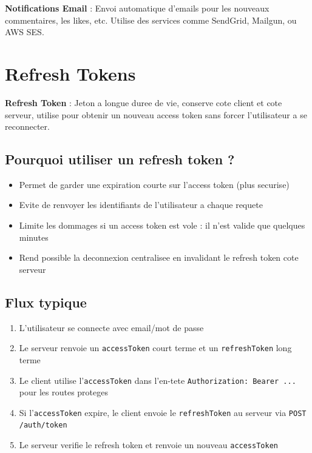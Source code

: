 \documentclass[a4paper,12pt]{book}
\begin{document}
\begin{definitionbox}
    \textbf{Notifications Email} : Envoi automatique d'emails pour les nouveaux commentaires, les likes, etc. Utilise des services comme SendGrid, Mailgun, ou AWS SES.
\end{definitionbox}

\section{Refresh Tokens}

\begin{definitionbox}
    \textbf{Refresh Token} : Jeton a longue duree de vie, conserve cote client et cote serveur, utilise pour obtenir un nouveau access token sans forcer l'utilisateur a se reconnecter.
\end{definitionbox}

\subsection{Pourquoi utiliser un refresh token ?}

\begin{itemize}
    \item Permet de garder une expiration courte sur l'access token (plus securise)
    \item Evite de renvoyer les identifiants de l'utilisateur a chaque requete
    \item Limite les dommages si un access token est vole : il n'est valide que quelques minutes
    \item Rend possible la deconnexion centralisee en invalidant le refresh token cote serveur
\end{itemize}

\subsection{Flux typique}

\begin{enumerate}
    \item L'utilisateur se connecte avec email/mot de passe
    \item Le serveur renvoie un \texttt{accessToken} court terme et un \texttt{refreshToken} long terme
    \item Le client utilise l'\texttt{accessToken} dans l'en-tete \texttt{Authorization: Bearer ...} pour les routes proteges
    \item Si l'\texttt{accessToken} expire, le client envoie le \texttt{refreshToken} au serveur via \texttt{POST /auth/token}
    \item Le serveur verifie le refresh token et renvoie un nouveau \texttt{accessToken}
\end{enumerate}
\end{document}
